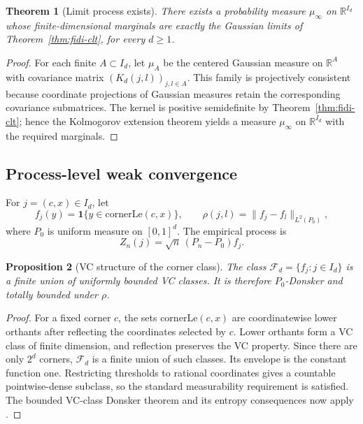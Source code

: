 \documentclass[pdflatex]{sn-jnl}
\theoremstyle{thmstyleone}
\newtheorem{theorem}{Theorem}[section]
\newtheorem{proposition}[theorem]{Proposition}
\theoremstyle{thmstyletwo}
\theoremstyle{thmstylethree}
\newcommand{\R}{\mathbb{R}}
\begin{document}
\begin{theorem}[Limit process exists]\label{thm:limit-process}
There exists a probability measure $\mu_\infty$ on $\R^{I_d}$ whose finite-dimensional marginals are exactly the Gaussian limits of Theorem~\ref{thm:fidi-clt}, for every $d\ge 1$.
\end{theorem}

\begin{proof}
For each finite $A\subset I_d$, let $\mu_A$ be the centered Gaussian measure on $\R^A$ with covariance matrix $(K_d(j,l))_{j,l\in A}$. This family is projectively consistent because coordinate projections of Gaussian measures retain the corresponding covariance submatrices. The kernel is positive semidefinite by Theorem~\ref{thm:fidi-clt}; hence the Kolmogorov extension theorem yields a measure $\mu_\infty$ on $\R^{I_d}$ with the required marginals.
\end{proof}

\subsection{Process-level weak convergence}\label{sec:chaining}

For $j=(c,x)\in I_d$, let
\[
  f_j(y)=\mathbf 1\{y\in\mathrm{cornerLe}(c,x)\},
  \qquad
  \rho(j,l)=\bigl\|f_j-f_l\bigr\|_{L^2(P_0)},
\]
where $P_0$ is uniform measure on $[0,1]^d$. The empirical process is
\[
  Z_n(j)=\sqrt n\,(P_n-P_0)f_j.
\]

\begin{proposition}[VC structure of the corner class]\label{prop:vc-class}
The class $\mathcal F_d=\{f_j:j\in I_d\}$ is a finite union of uniformly bounded VC classes. It is therefore $P_0$-Donsker and totally bounded under $\rho$.
\end{proposition}

\begin{proof}
For a fixed corner $c$, the sets $\mathrm{cornerLe}(c,x)$ are coordinatewise lower orthants after reflecting the coordinates selected by $c$. Lower orthants form a VC class of finite dimension, and reflection preserves the VC property. Since there are only $2^d$ corners, $\mathcal F_d$ is a finite union of such classes. Its envelope is the constant function one. Restricting thresholds to rational coordinates gives a countable pointwise-dense subclass, so the standard measurability requirement is satisfied. The bounded VC-class Donsker theorem and its entropy consequences now apply \cite[Chs.~2.5--2.6]{vanderVaartWellner1996}.
\end{proof}
\end{document}
